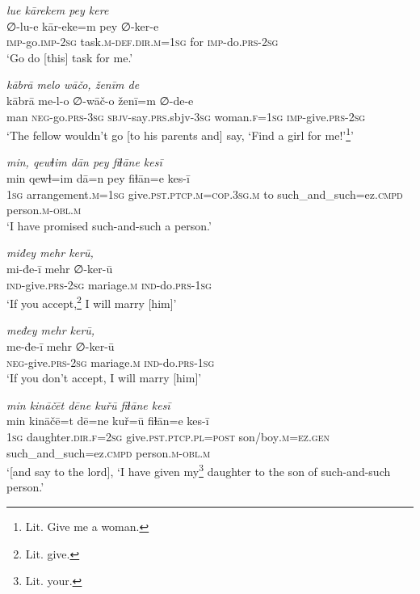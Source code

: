 \ea \label{RE.20}
\textit{lue kārekem pey kere} \\ 
\gll ∅-lu-e kār-eke=m pey ∅-ker-e \\ 
 \textsc{imp-}go.\textsc{imp-}\textsc{2sg} task\textsc{.m}\textsc{-def}\textsc{.dir}\textsc{.m}\textsc{=\textsc{1sg}} for \textsc{imp-}do\textsc{.prs}-\textsc{2sg} \\ 
\glt `Go do [this] task for me.'
\z 
 
\ea \label{RE.29}
\textit{kābrā melo wāčo, ženīm de} \\ 
\gll kābrā me-l-o ∅-wāč-o ženī=m ∅-de-e \\ 
 man \textsc{neg-}go\textsc{.prs}\textsc{-3sg} \textsc{sbjv-}say\textsc{.prs}.sbjv\textsc{-3sg} woman\textsc{.f}\textsc{=\textsc{1sg}} \textsc{imp-}give\textsc{.prs}-\textsc{2sg} \\ 
\glt `The fellow wouldn’t go [to his parents and] say, ‘Find a girl for me!’\footnote{Lit. Give me a woman.}'
\z 
 
\ea \label{RE.36}
\textit{min, qewɫim dān pey fiɫāne kesī} \\ 
\gll min qewɫ=im dā=n pey fiɫān=e kes-ī \\ 
 \textsc{1sg} arrangement\textsc{.m}\textsc{=\textsc{1sg}} give\textsc{.pst}\textsc{.ptcp}\textsc{.m}\textsc{=cop}\textsc{.3sg}\textsc{.m} to such\_and\_such=ez\textsc{.cmpd} person\textsc{.m}\textsc{-obl}\textsc{.m} \\ 
\glt `I have promised such-and-such a person.'
\z 
 
\ea \label{RE.37}
\textit{miđey mehr kerū,} \\ 
\gll mi-đe-ī mehr ∅-ker-ū \\ 
 \textsc{ind-}give\textsc{.prs}-\textsc{2sg} mariage\textsc{.m} \textsc{ind-}do\textsc{.prs}\textsc{-\textsc{1sg}} \\ 
\glt `If you accept,\footnote{Lit. give.} I will marry [him]'
\z 
 
\ea \label{RE.38}
\textit{međey mehr kerū,} \\ 
\gll me-đe-ī mehr ∅-ker-ū \\ 
 \textsc{neg-}give\textsc{.prs}-\textsc{2sg} mariage\textsc{.m} \textsc{ind-}do\textsc{.prs}\textsc{-\textsc{1sg}} \\ 
\glt `If you don’t accept, I will marry [him]'
\z 
 
\ea \label{RE.49}
\textit{min kināčēt dēne kuřū fiɫāne kesī} \\ 
\gll min kināčē=t dē=ne kuř=ū fiɫān=e kes-ī \\ 
 \textsc{1sg} daughter\textsc{.dir}\textsc{.f}\textsc{=\textsc{2sg}} give\textsc{.pst}\textsc{.ptcp}\textsc{.pl}\textsc{=\textsc{post}} son/boy\textsc{.m}\textsc{=ez.gen} such\_and\_such=ez\textsc{.cmpd} person\textsc{.m}\textsc{-obl}\textsc{.m} \\ 
\glt `[and say to the lord], ‘I have given my\footnote{Lit. your.} daughter to the son of such-and-such person.'
\z 
 
